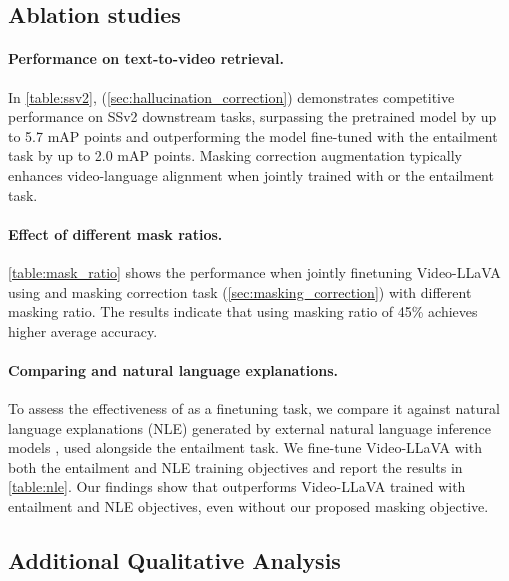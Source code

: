 \subsection{Ablation studies}
\label{app:ablation}

\paragraph{Performance on text-to-video retrieval.}
In \autoref{table:ssv2}, \method{} (\autoref{sec:hallucination_correction}) demonstrates competitive performance on SSv2 downstream tasks, surpassing the pretrained model by up to 5.7 mAP points and outperforming the model fine-tuned with the entailment task by up to 2.0 mAP points.
Masking correction augmentation typically enhances video-language alignment when jointly trained with \method{} or the entailment task.




\paragraph{Effect of different mask ratios.}
\autoref{table:mask_ratio} shows the performance when jointly finetuning Video-LLaVA using \method{} and masking correction task (\autoref{sec:masking_correction}) with different masking ratio.
The results indicate that using masking ratio of 45\% achieves higher average accuracy.




\paragraph{Comparing \method{} and natural language explanations.}
To assess the effectiveness of \method{} as a finetuning task, we compare it against natural language explanations (NLE) generated by external natural language inference models \cite{bansal2024videocon}, used alongside the entailment task. We fine-tune Video-LLaVA with both the entailment and NLE training objectives and report the results in \autoref{table:nle}. Our findings show that \method{} outperforms Video-LLaVA trained with entailment and NLE objectives, even without our proposed masking objective.





\subsection{Additional Qualitative Analysis}
\label{app:qualitative_analysis}

